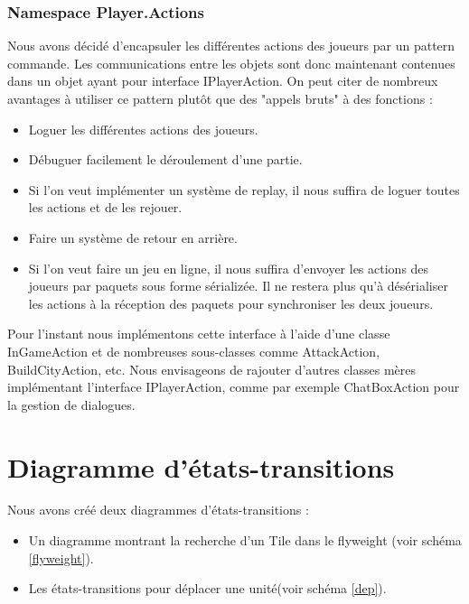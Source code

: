 				\subsubsection{Namespace Player.Actions}
Nous avons décidé d'encapsuler les différentes actions des joueurs par un pattern commande. 
Les communications entre les objets sont donc maintenant contenues dans un objet ayant pour interface IPlayerAction.
On peut citer de nombreux avantages à utiliser ce pattern plutôt que des "appels bruts" à des fonctions :
\begin{itemize}
\item Loguer les différentes actions des joueurs.
\item Débuguer facilement le déroulement d'une partie.
\item Si l'on veut implémenter un système de replay, il nous suffira de loguer toutes les actions et de les rejouer.
\item Faire un système de retour en arrière.
\item Si l'on veut faire un jeu en ligne, il nous suffira d'envoyer les actions des joueurs par paquets sous forme sérializée. Il ne restera plus qu'à 
désérialiser les actions à la réception des paquets pour synchroniser les deux joueurs.
\end{itemize}

Pour l'instant nous implémentons cette interface à l'aide d'une classe InGameAction et de nombreuses sous-classes comme AttackAction, BuildCityAction, etc.
Nous envisageons de rajouter d'autres classes mères implémentant l'interface IPlayerAction, comme par exemple ChatBoxAction pour la gestion de dialogues.

\section{Diagramme d'états-transitions}
Nous avons créé deux diagrammes d'états-transitions :
\begin{itemize}
\item Un diagramme montrant la recherche d'un Tile dans le flyweight (voir schéma \ref{flyweight}).
\item Les états-transitions pour déplacer une unité(voir schéma \ref{dep}).
\end{itemize}

